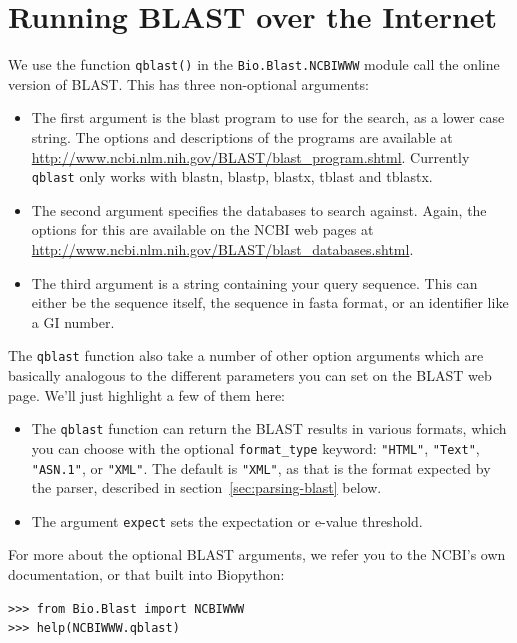 \documentclass{report}
\begin{document}
\section{Running BLAST over the Internet}
\label{sec:running-www-blast}

We use the function \verb|qblast()| in the \verb|Bio.Blast.NCBIWWW| module
call the online version of BLAST.  This has three non-optional arguments:
\begin{itemize}
\item The first argument is the blast program to use for the search, as a
lower case string. The options and descriptions of the programs are
available at \url{http://www.ncbi.nlm.nih.gov/BLAST/blast_program.shtml}.
Currently \verb|qblast| only works with blastn, blastp, blastx, tblast
and tblastx.
\item The second argument specifies the databases to search against. Again,
the options for this are available on the NCBI web pages at
\url{http://www.ncbi.nlm.nih.gov/BLAST/blast_databases.shtml}.
\item The third argument is a string containing your query sequence.  This
can either be the sequence itself, the sequence in fasta format,
or an identifier like a GI number.
\end{itemize}

The \verb|qblast| function also take a number of other option arguments
which are basically analogous to the different parameters you can set
on the BLAST web page.  We'll just highlight a few of them here:

\begin{itemize}
\item The \verb|qblast| function can return the BLAST results in various
formats, which you can choose with the optional \verb|format_type| keyword:
\verb|"HTML"|, \verb|"Text"|, \verb|"ASN.1"|, or \verb|"XML"|.
The default is \verb|"XML"|, as that is the format expected by the parser,
described in section~\ref{sec:parsing-blast} below.
\item The argument \verb|expect| sets the expectation or e-value threshold.
\end{itemize}

For more about the optional BLAST arguments, we refer you to the NCBI's own
documentation, or that built into Biopython:

\begin{verbatim}
>>> from Bio.Blast import NCBIWWW
>>> help(NCBIWWW.qblast)
\end{verbatim}
\end{document}
